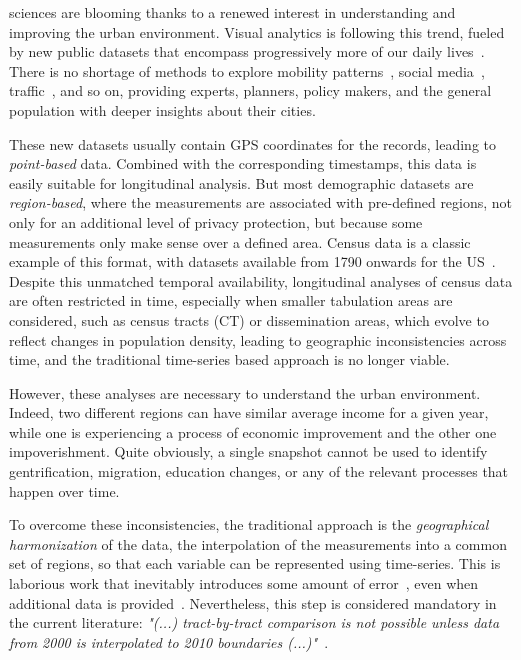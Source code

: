  sciences are blooming thanks to a renewed interest in
understanding and improving the urban environment. Visual analytics is following
this trend, fueled by new public datasets that encompass progressively more of
our daily lives~\cite{Chen2017}. There is no shortage of methods to explore
mobility patterns~\cite{VonLandesberger2016}, social media~\cite{Chen2017},
traffic~\cite{chen2015survey}, and so on, providing experts, planners, policy
makers, and the general population with deeper insights about their cities.


These new datasets usually contain GPS coordinates for the records, leading to
\emph{point-based} data. Combined with the corresponding timestamps, this data
is easily suitable for longitudinal analysis. But most demographic datasets are
\emph{region-based}, where the measurements are associated with pre-defined
regions, not only for an additional level of privacy protection, but because
some measurements only make sense over a defined area. Census data is a classic
example of this format, with datasets available from 1790 onwards for the
US~\cite{nhgis}. Despite this unmatched temporal availability, longitudinal
analyses of census data are often restricted in time, especially when smaller
tabulation areas are considered, such as census tracts (CT) or dissemination
areas, which evolve to reflect changes in population density, leading to
geographic inconsistencies across time, and the traditional time-series based
approach is no longer viable. 


However, these analyses are necessary to understand the urban environment.
Indeed, two different regions can have similar average income for a given year,
while one is experiencing a process of economic improvement and the other one
impoverishment. Quite obviously, a single snapshot cannot be used to identify
gentrification, migration, education changes, or any of the relevant processes
that happen over time.


To overcome these inconsistencies, the traditional approach is the
\emph{geographical harmonization} of the data, the interpolation of the
measurements into a common set of
regions\cite{Logan2014,Hallisey2017,Allen2018}, so that each variable can be
represented using time-series. This is laborious work that inevitably introduces
some amount of error~\cite{Logan2016}, even when additional data is
provided~\cite{eicher2001dasymetric}. Nevertheless, this step is considered
mandatory in the current literature: \emph{"(...) tract-by-tract comparison is
not possible unless data from 2000 is interpolated to 2010 boundaries
(...)"}~\cite{Dmowska2017}.



